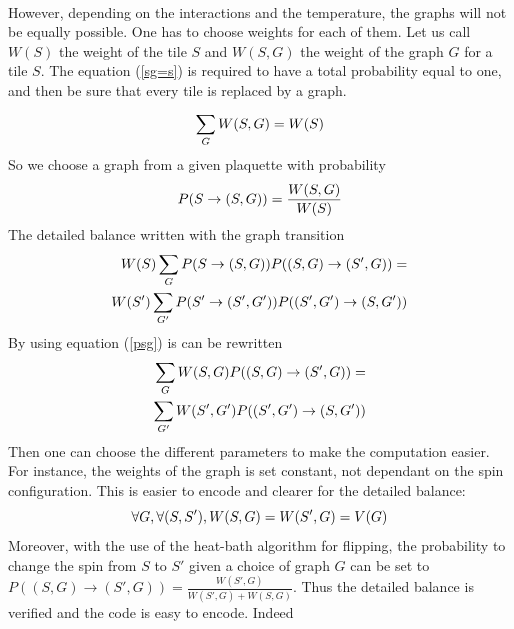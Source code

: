 \documentclass[a4paper,12pt,twoside]{article}
\begin{document}
	\paragraph{}
	However, depending on the interactions and the temperature, the graphs will not be equally possible. One has to choose weights for each of them. Let us call $W(S)$ the weight of the tile $S$ and $W(S,G)$ the weight of the graph $G$ for a tile $S$. The equation (\ref{sg=s}) is required to have a total probability equal to one, and then be sure that every tile is replaced by a graph.
	\begin{equation}
		\centering
		\label{sg=s}
		\sum_{G}^{} W(S,G) = W(S)
	\end{equation}
	So we choose a graph from a given plaquette with probability
	\begin{equation}
		\centering
		P(S\rightarrow(S, G)) = \frac{W(S,G)}{W(S)}
		\label{psg}
	\end{equation}
	The detailed balance written with the graph transition
	\begin{equation}
		\begin{split}
			W(S)\sum_{G}P(S\rightarrow (S,G))P((S,G)\rightarrow(S',G))
			= \\ W(S') \sum_{G'} P(S'\rightarrow (S',G'))P((S',G')\rightarrow(S,G'))
		\end{split}
		\centering
	\end{equation}
	By using equation (\ref{psg}) is can be rewritten
	\begin{equation}
		\begin{split}
		\sum_{G}W(S,G)P((S,G)\rightarrow(S',G)) = \\ \sum_{G'}W(S',G')P((S',G')\rightarrow(S,G'))
		\end{split}
		\centering
	\end{equation}
	Then one can choose the different parameters to make the computation easier. For instance, the weights of the graph is set constant, not dependant on the spin configuration. This is easier to encode and clearer for the detailed balance:
	\begin{equation}
		\centering
		\forall G, \forall(S,S'), W(S,G) = W(S',G) = V(G) \label{indepG}
	\end{equation}
	 Moreover, with the use of the heat-bath algorithm for flipping, the probability to change the spin from $S$ to $S'$ given a choice of graph $G$ can be set to $P((S,G)\rightarrow(S',G)) = \frac{W(S',G)}{W(S',G) + W(S,G)}$. Thus the detailed balance is verified and the code is easy to encode. Indeed
\end{document}
